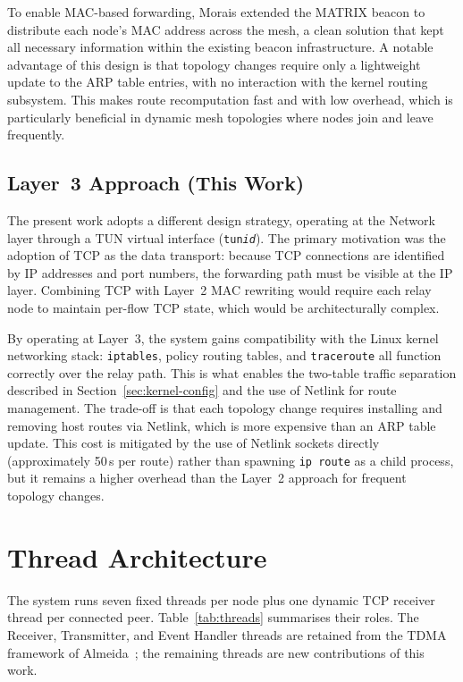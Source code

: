 To enable MAC-based forwarding, Morais extended the MATRIX beacon to distribute each
node's MAC address across the mesh, a clean solution that kept all necessary information
within the existing beacon infrastructure. A notable advantage of this design is that
topology changes require only a lightweight update to the ARP table entries, with no
interaction with the kernel routing subsystem. This makes route recomputation fast and
with low overhead, which is particularly beneficial in dynamic mesh topologies where nodes
join and leave frequently.

\subsection{Layer~3 Approach (This Work)}

The present work adopts a different design strategy, operating at the Network layer through
a TUN virtual interface (\texttt{tun\textit{id}}). The primary motivation was the adoption
of TCP as the data transport: because TCP connections are identified by IP addresses and
port numbers, the forwarding path must be visible at the IP layer. Combining TCP with
Layer~2 MAC rewriting would require each relay node to maintain per-flow TCP state, which
would be architecturally complex.

By operating at Layer~3, the system gains compatibility with the Linux kernel networking
stack: \texttt{iptables}, policy routing tables, and \texttt{traceroute} all function
correctly over the relay path. This is what enables the two-table traffic separation
described in Section~\ref{sec:kernel-config} and the use of Netlink for route management.
The trade-off is that each topology change requires installing and removing host routes via
Netlink, which is more expensive than an ARP table update. This cost is mitigated by the
use of Netlink sockets directly (approximately 50\,\textmu s per route) rather than
spawning \texttt{ip route} as a child process, but it remains a higher overhead than the
Layer~2 approach for frequent topology changes.


\section{Thread Architecture}
\label{sec:threads}

The system runs seven fixed threads per node plus one dynamic TCP receiver thread per
connected peer. Table~\ref{tab:threads} summarises their roles. The Receiver, Transmitter,
and Event Handler threads are retained from the TDMA framework of
Almeida~\cite{almeida2023synchronization}; the remaining threads are new contributions of
this work.

